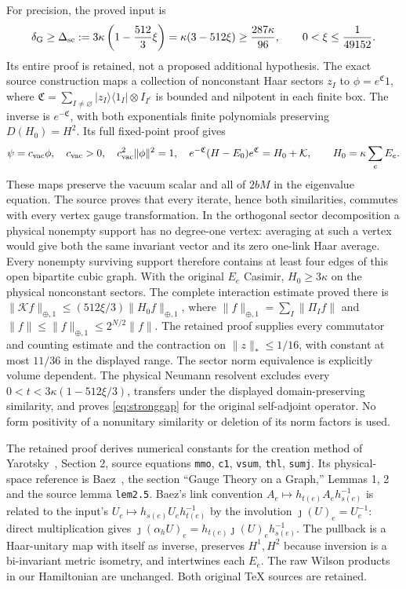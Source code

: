 For precision, the proved input is
\begin{equation}\label{eq:stronggap}
 \delta_{\rm G}\geq\Delta_{\rm sc}
 :=3\kappa\left(1-\frac{512}{3}\xi\right)
 =\kappa(3-512\xi)\geq\frac{287\kappa}{96},
 \qquad 0<\xi\leq\frac1{49152}.
\end{equation}
Its entire proof is retained, not a proposed additional hypothesis.
The exact source construction maps a collection of nonconstant
Haar sectors $z_I$ to $\phi=e^{\mathfrak C}1$, where
$\mathfrak C=\sum_{I\ne\varnothing}|z_I\rangle\langle1_I|
\otimes I_{I^c}$ is bounded and nilpotent in each finite box.
The inverse is $e^{-\mathfrak C}$, with both exponentials finite
polynomials preserving $D(H_0)=H^2$. Its full fixed-point proof gives
\[
 \psi=c_{\rm vac}\phi,\quad
 c_{\rm vac}>0,\quad c_{\rm vac}^2\|\phi\|^2=1,\quad
 e^{-\mathfrak C}(H-E_0)e^{\mathfrak C}=H_0+\mathcal K,
 \qquad H_0=\kappa\sum_eE_e.
\]
These maps preserve the vacuum scalar and all of $2bM$ in the
eigenvalue equation. The source proves that every iterate, hence both
similarities, commutes with every vertex gauge transformation.
In the orthogonal sector decomposition a physical nonempty support
has no degree-one vertex: averaging at such a vertex would give both
the same invariant vector and its zero one-link Haar average.
Every nonempty surviving support therefore contains at least four
edges of this open bipartite cubic graph. With the original
$E_e$ Casimir, $H_0\geq3\kappa$ on the physical nonconstant sectors.
The complete interaction estimate proved there is
$\|\mathcal K f\|_{\oplus,1}\leq(512\xi/3)\|H_0f\|_{\oplus,1}$,
where $\|f\|_{\oplus,1}=\sum_I\|\Pi_If\|$ and
$\|f\|\leq\|f\|_{\oplus,1}\leq2^{N/2}\|f\|$.
The retained proof supplies every commutator and counting estimate
and the contraction on $\|z\|_*\leq1/16$, with constant at most
$11/36$ in the displayed range. The sector norm equivalence is
explicitly volume dependent. The physical Neumann resolvent excludes
every $0<t<3\kappa(1-512\xi/3)$, transfers under the displayed
domain-preserving similarity, and proves \eqref{eq:stronggap} for the
original self-adjoint operator. No form positivity of a nonunitary
similarity or deletion of its norm factors is used.

The retained proof derives numerical constants for the creation method
of Yarotsky~\cite{Yarotsky}, Section 2, source equations
\texttt{mmo}, \texttt{c1}, \texttt{vsum}, \texttt{thl},
\texttt{sumj}. Its physical-space reference is Baez~\cite{Baez},
the section ``Gauge Theory on a Graph,'' Lemmas 1, 2 and the source
lemma \texttt{lem2.5}. Baez's link convention
$A_e\mapsto h_{t(e)}A_eh_{s(e)}^{-1}$ is related to the input's
$U_e\mapsto h_{s(e)}U_eh_{t(e)}^{-1}$ by the involution
$\jmath(U)_e=U_e^{-1}$: direct multiplication gives
$\jmath(\alpha_hU)_e=h_{t(e)}\jmath(U)_eh_{s(e)}^{-1}$.
The pullback is a Haar-unitary map with itself as inverse,
preserves $H^1,H^2$ because inversion is a bi-invariant metric
isometry, and intertwines each $E_e$. The raw Wilson products in
our Hamiltonian are unchanged. Both original TeX sources are retained.

